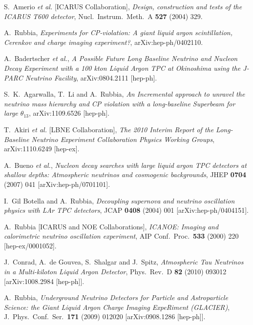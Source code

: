 \documentclass[final,3p,times,twocolumn]{elsarticle}
\begin{document}
\begin{thebibliography}{00}



  S.~Amerio {\it et al.}  [ICARUS Collaboration],
  \emph{Design, construction and tests of the ICARUS T600 detector},
  Nucl.\ Instrum.\ Meth.\  A {\bf 527} (2004) 329.

  A.~Rubbia,
  \emph{Experiments for CP-violation: A giant liquid argon scintillation,  Cerenkov and charge imaging experiment?},
  arXiv:hep-ph/0402110.

  A.~Badertscher {\it et al.},
  \emph{A Possible Future Long Baseline Neutrino and Nucleon Decay Experiment  with a 100 kton Liquid Argon TPC at Okinoshima using the J-PARC Neutrino
  Facility},
  arXiv:0804.2111 [hep-ph].

  S.~K.~Agarwalla, T.~Li and A.~Rubbia,
  \emph{An Incremental approach to unravel the neutrino mass hierarchy and CP violation with a long-baseline Superbeam for large $\theta_{13}$},
  arXiv:1109.6526 [hep-ph].

  T.~Akiri {\it et al.}  [LBNE Collaboration],
  \emph{The 2010 Interim Report of the Long-Baseline Neutrino Experiment Collaboration Physics Working Groups},
  arXiv:1110.6249 [hep-ex].

  A.~Bueno {\it et al.},
  \emph{Nucleon decay searches with large liquid argon TPC detectors at shallow
  depths: Atmospheric neutrinos and cosmogenic backgrounds},
  JHEP {\bf 0704} (2007) 041
  [arXiv:hep-ph/0701101].

  I.~Gil Botella and A.~Rubbia,
  \emph{Decoupling supernova and neutrino oscillation physics with LAr TPC
  detectors},
  JCAP {\bf 0408} (2004) 001
  [arXiv:hep-ph/0404151].

  A.~Rubbia [ICARUS and NOE Collaborations],
  \emph{ICANOE: Imaging and calorimetric neutrino oscillation experiment}, AIP Conf.\ Proc.\  {\bf 533} (2000) 220
  [hep-ex/0001052].

  J.~Conrad, A.~de Gouvea, S.~Shalgar and J.~Spitz,
  \emph{Atmospheric Tau Neutrinos in a Multi-kiloton Liquid Argon Detector},
  Phys.\ Rev.\ D {\bf 82} (2010) 093012
  [arXiv:1008.2984 [hep-ph]].

A.~Rubbia, \emph{Underground Neutrino Detectors for Particle and Astroparticle Science: the Giant Liquid Argon Charge Imaging ExpeRiment (GLACIER)}, J.\ Phys.\ Conf.\ Ser.\  {\bf 171} (2009) 012020 [arXiv:0908.1286 [hep-ph]].


\end{thebibliography}
\end{document}
